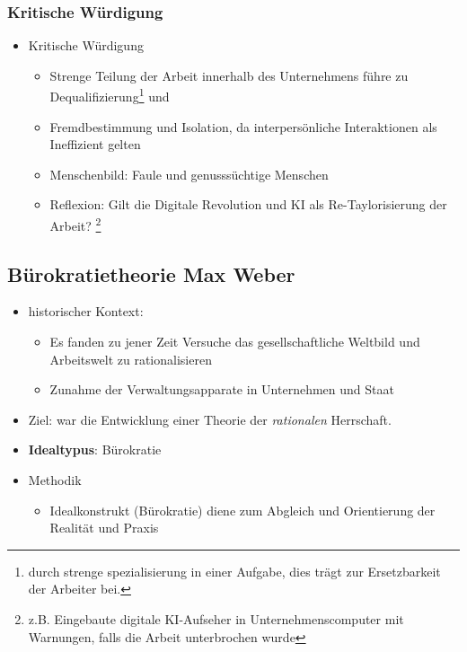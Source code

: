 \subsubsection{Kritische Würdigung}
\begin{itemize}
   \item Kritische Würdigung
    \begin{itemize}
        \item Strenge Teilung der Arbeit innerhalb des Unternehmens führe zu Dequalifizierung\footnote{durch strenge spezialisierung in einer Aufgabe, dies trägt zur Ersetzbarkeit der Arbeiter bei.} und
        \item Fremdbestimmung und Isolation, da interpersönliche Interaktionen als Ineffizient gelten
        \item Menschenbild: Faule und genusssüchtige Menschen
        \item Reflexion: Gilt die Digitale Revolution und KI als Re-Taylorisierung der Arbeit? \footnote{z.B. Eingebaute digitale KI-Aufseher in Unternehmenscomputer mit Warnungen, falls die Arbeit unterbrochen wurde}
    \end{itemize}
\end{itemize}
\subsection{Bürokratietheorie Max Weber}
\begin{itemize}
\item historischer Kontext:
    \begin{itemize}
        \item Es fanden zu jener Zeit Versuche das gesellschaftliche Weltbild und Arbeitswelt zu rationalisieren
        \item Zunahme der Verwaltungsapparate in Unternehmen und Staat
    \end{itemize} 
    \item Ziel: war die Entwicklung einer Theorie der \textit{rationalen} Herrschaft.
    \item \textbf{Idealtypus}: Bürokratie
    \item Methodik
    \begin{itemize}
        \item Idealkonstrukt (Bürokratie) diene zum Abgleich und Orientierung der Realität und Praxis
    \end{itemize}
\end{itemize}
